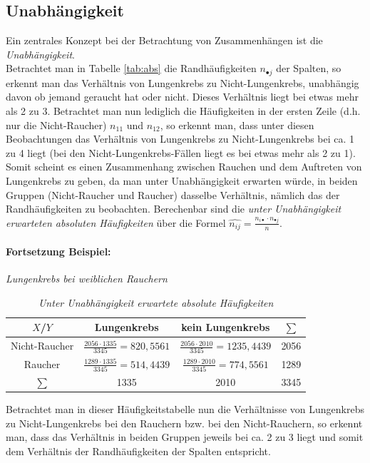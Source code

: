 \documentclass[a4paper]{article}
\begin{document}
\subsection{Unabhängigkeit}\label{sec:unabh}
Ein zentrales Konzept bei der Betrachtung von Zusammenhängen ist die \textit{Unabhängigkeit}.\\
Betrachtet man in Tabelle \ref{tab:abs} die Randhäufigkeiten $n_{\bullet j}$ der Spalten, so erkennt man das Verhältnis von Lungenkrebs zu Nicht-Lungenkrebs, unabhängig davon ob jemand geraucht hat oder nicht. Dieses Verhältnis liegt bei etwas mehr als 2 zu 3. Betrachtet man nun lediglich die Häufigkeiten in der ersten Zeile (d.h. nur die Nicht-Raucher) $n_{11}$ und $n_{12}$, so erkennt man, dass unter diesen Beobachtungen das Verhältnis von Lungenkrebs zu Nicht-Lungenkrebs bei ca. 1 zu 4 liegt (bei den Nicht-Lungenkrebs-Fällen liegt es bei etwas mehr als 2 zu 1). Somit scheint es einen Zusammenhang zwischen Rauchen und dem Auftreten von Lungenkrebs zu geben, da man unter Unabhängigkeit erwarten würde, in beiden Gruppen (Nicht-Raucher und Raucher) dasselbe Verhältnis, nämlich das der Randhäufigkeiten zu beobachten. Berechenbar sind die \textit{unter Unabhängigkeit erwarteten absoluten Häufigkeiten} über die Formel $\hat{n_{ij}} = \frac{n_{i\bullet} \cdot n_{\bullet j}}{n}$.

\noindent \paragraph{Fortsetzung Beispiel:} \textit{Lungenkrebs bei weiblichen Rauchern}
\begin{table}[htbp]
\begin{tabular}{c|cc|c}
    $X$/$Y$         & Lungenkrebs & kein Lungenkrebs & $\sum$ \\
     \hline
    Nicht-Raucher   & $\frac{2056\cdot1335}{3345} = 820,5561$         & $\frac{2056\cdot2010}{3345} = 1235,4439$             & 2056 \\
    Raucher         & $\frac{1289\cdot1335}{3345} = 514,4439$         & $\frac{1289\cdot2010}{3345} = 774,5561$             & 1289 \\
    \hline
    $\sum$          & 1335        & 2010             & 3345
\end{tabular}
    \caption{\textit{Unter Unabhängigkeit erwartete absolute Häufigkeiten}}
    \label{tab:abs-unabh}
\end{table}

\noindent Betrachtet man in dieser Häufigkeitstabelle nun die Verhältnisse von Lungenkrebs zu Nicht-Lungen\-krebs bei den Rauchern bzw. bei den Nicht-Rauchern, so erkennt man, dass das Verhältnis in beiden Gruppen jeweils bei ca. 2 zu 3 liegt und somit dem Verhältnis der Randhäufigkeiten der Spalten entspricht.
\end{document}
